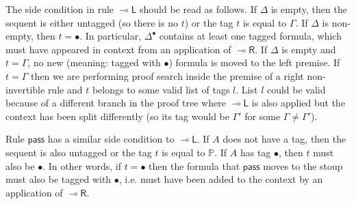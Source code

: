 \documentclass[submission,copyright,creativecommons]{eptcs}
\theoremstyle{definition}
\newcommand{\lright}{{\multimap}\mathsf{R}}
\newcommand{\lleft}{{\multimap}\mathsf{L}}
\newcommand{\pass}{\mathsf{pass}}
\newcommand{\tP}{\mathbb{P}}
\begin{document}
The side condition in rule $\lleft$ should be read as follows. If $\Delta$ is empty, then the sequent is either untagged (so there is no $t$) or the tag $t$ is equal to $ \Gamma$. If $\Delta$ is non-empty, then $t = \bullet$. In particular,
$\Delta^\bullet$ contains at least one tagged formula, which must have appeared in context from an application of $\lright$. If $\Delta$ is empty and $t = \Gamma$, no new (meaning: tagged with $\bullet$) formula is moved to the left premise. If $t = \Gamma$ then we are performing proof search inside the premise of a right non-invertible rule and $t$ belongs to some valid list of tags $l$. List $l$ could be valid because of a different branch in the proof tree where $\lleft$ is also applied but the context has been split differently (so its tag would be $ \Gamma'$ for some $\Gamma \not= \Gamma'$).

Rule $\pass$ has a similar side condition to $\lleft$. If $A$ does not have a tag, then the sequent is also untagged or the tag $t$ is equal to $\tP$. If $A$ has tag $\bullet$, then $t$ must also be $\bullet$. In other words, if $t = \bullet$ then the formula that $\pass$ moves to the stoup must also be tagged with $\bullet$, i.e. must have been added to the context by an application of $\lright$.
\end{document}
